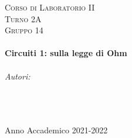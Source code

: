\documentclass[a4paper]{article}
\begin{document}
\begin{titlepage}
\center
    
\textsc{\LARGE Corso di Laboratorio II}\\[1.5cm] %
\textsc{\large Turno 2A}\\[0.5cm] %
\textsc{\large Gruppo 14}\\[0.5cm]

\HRule \\[0.6cm]
{ \huge \bfseries Circuiti 1: sulla legge di Ohm}\\[0.4cm] %
\HRule \\[1.5cm]
    

\Large \emph{Autori:} \\
\textsc{} \\
\textsc{} \\
\textsc{} \\ [4cm]

\vspace{8cm}

{\large Anno Accademico 2021-2022}\\[2cm] %


\vfill
\end{titlepage}




\tableofcontents
\clearpage

\listoffigures
{}
\clearpage

\setcounter{page}{1}
\end{document}
